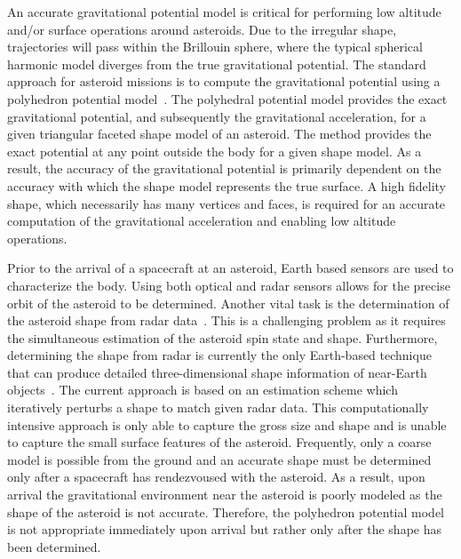 \documentclass[letterpaper, paper,11pt]{AAS}		%
\begin{document}
An accurate gravitational potential model is critical for performing low altitude and/or surface operations around asteroids.
Due to the irregular shape, trajectories will pass within the Brillouin sphere, where the typical spherical harmonic model diverges from the true gravitational potential.
The standard approach for asteroid missions is to compute the gravitational potential using a polyhedron potential model~\cite{werner1996}.
The polyhedral potential model provides the exact gravitational potential, and subsequently the gravitational acceleration, for a given triangular faceted shape model of an asteroid.
The method provides the exact potential at any point outside the body for a given shape model.
As a result, the accuracy of the gravitational potential is primarily dependent on the accuracy with which the shape model represents the true surface.
A high fidelity shape, which necessarily has many vertices and faces, is required for an accurate computation of the gravitational acceleration and enabling low altitude operations.

Prior to the arrival of a spacecraft at an asteroid, Earth based sensors are used to characterize the body.
Using both optical and radar sensors allows for the precise orbit of the asteroid to be determined.
Another vital task is the determination of the asteroid shape from radar data~\cite{hudson1994,busch2011}.
This is a challenging problem as it requires the simultaneous estimation of the asteroid spin state and shape.
Furthermore, determining the shape from radar is currently the only Earth-based technique that can produce detailed three-dimensional shape information of near-Earth objects~\cite{greenberg2015}.
The current approach is based on an estimation scheme which iteratively perturbs a shape to match given radar data.
This computationally intensive approach is only able to capture the gross size and shape and is unable to capture the small surface features of the asteroid.
Frequently, only a coarse model is possible from the ground and an accurate shape must be determined only after a spacecraft has rendezvoused with the asteroid.
As a result, upon arrival the gravitational environment near the asteroid is poorly modeled as the shape of the asteroid is not accurate.
Therefore, the polyhedron potential model is not appropriate immediately upon arrival but rather only after the shape has been determined.
\end{document}
